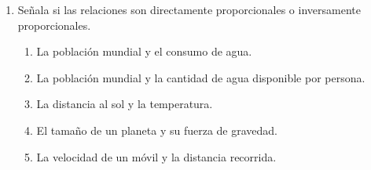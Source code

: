 \documentclass[11pt]{book}
\begin{document}
\begin{boxK}
  \begin{enumerate}
    \item Señala si las relaciones son directamente proporcionales o inversamente proporcionales.
          \begin{enumerate}
            \item La población mundial y el consumo de agua.\\
            \item  La población mundial y la cantidad de agua disponible por persona.\\
            \item La distancia al sol y la temperatura.\\
            \item  El tamaño de un planeta y su fuerza de gravedad.\\
            \item  La velocidad de un móvil y la distancia recorrida.\\

\end{enumerate}
\end{enumerate}
\end{boxK}
\end{document}
